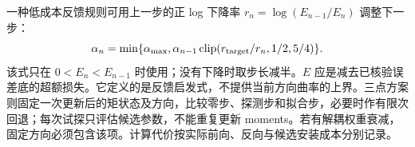 一种低成本反馈规则可用上一步的正 log 下降率 $r_n=\log(E_{n-1}/E_n)$ 调整下一步：
\begin{equation}
\alpha_n=\min\{\alpha_{\max},\alpha_{n-1}
\operatorname{clip}(r_{\rm target}/r_n,1/2,5/4)\}.
\end{equation}
该式只在 $0<E_n<E_{n-1}$ 时使用；没有下降时取步长减半。$E$ 应是减去已核验误差底的超额损失。它定义的是反馈启发式，不提供当前方向曲率的上界。三点方案则固定一次更新后的矩状态及方向，比较零步、探测步和拟合步，必要时作有限次回退；每次试探只评估候选参数，不能重复更新 moments。若有解耦权重衰减，固定方向必须包含该项。计算代价按实际前向、反向与候选安装成本分别记录。
